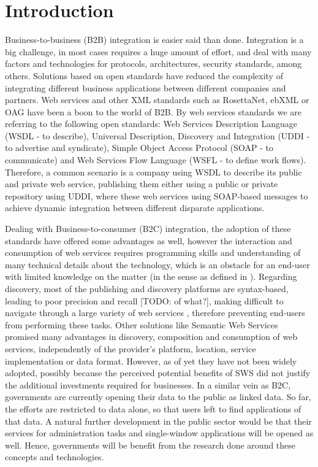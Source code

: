 
\section{Introduction}

Business-to-business (B2B) integration is easier said than done. Integration is a big challenge, in most cases requires a huge amount of effort, and deal with many factors and technologies for protocols, architectures, security standards, among others. Solutions based on open standards have reduced the complexity of integrating different business applications between different companies and partners. Web services and other XML standards such as RosettaNet, ebXML or OAG have been a boon to the world of B2B. By web services standards we are referring to the following open standards: Web Services Description Language (WSDL - to describe), Universal Description, Discovery and Integration (UDDI - to advertise and syndicate), Simple Object Access Protocol (SOAP - to communicate) and Web Services Flow Language (WSFL - to define work flows). Therefore, a common scenario is a company using WSDL to describe its public and private web service, publishing them either using a public or private repository using UDDI, where these web services using SOAP-based messages to achieve dynamic integration between different disparate applications.

Dealing with Business-to-consumer (B2C) integration, the adoption of these standards have offered some advantages as well, however the interaction and consumption of web services requires programming skills and understanding of many technical details about the technology, which is an obstacle for an end-user with limited knowledge on the matter (in the sense as defined in \cite{fuchsloch2010}). 
Regarding discovery, most of the publishing and discovery platforms are syntax-based, leading to poor precision and recall [TODO: of what?], making difficult to navigate through a large variety of web services \cite{pilioura_acm2009}, 
therefore preventing end-users from performing these tasks. 
Other solutions like Semantic Web Services promised many advantages in discovery, composition and consumption of web services, independently of the provider's platform, location,  service implementation or data format. 
However, as of yet they have not been widely adopted, 
possibly because the perceived potential benefits of SWS did not justify the additional investments required for businesses. 
In a similar vein as B2C, governments are currently opening their data to the public as linked data. 
So far, the efforts are restricted to data alone, so that users left to find applications of that data. 
A natural further development in the public sector would be that their services for administration tasks and single-window applications will be opened as well. Hence, governments will be benefit from the research done around these concepts and technologies.


